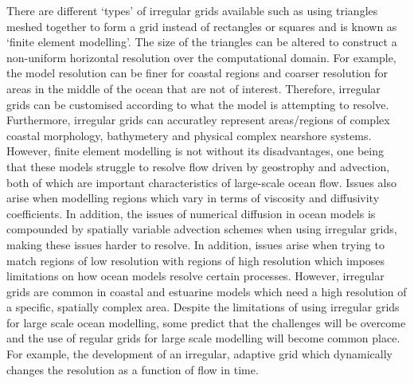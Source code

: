 \documentclass[
]{article}
\begin{document}
There are different `types' of irregular grids available such as using
triangles meshed together to form a grid instead of rectangles or
squares and is known as `finite element modelling'. The size of the
triangles can be altered to construct a non-uniform horizontal
resolution over the computational domain. For example, the model
resolution can be finer for coastal regions and coarser resolution for
areas in the middle of the ocean that are not of interest. Therefore,
irregular grids can be customised according to what the model is
attempting to resolve. Furthermore, irregular grids can accuratley
represent areas/regions of complex coastal morphology, bathymetery and
physical complex nearshore systems. However, finite element modelling is
not without its disadvantages, one being that these models struggle to
resolve flow driven by geostrophy and advection, both of which are
important characteristics of large-scale ocean flow. Issues also arise
when modelling regions which vary in terms of viscosity and diffusivity
coefficients. In addition, the issues of numerical diffusion in ocean
models is compounded by spatially variable advection schemes when using
irregular grids, making these issues harder to resolve. In addition,
issues arise when trying to match regions of low resolution with regions
of high resolution which imposes limitations on how ocean models resolve
certain processes. However, irregular grids are common in coastal and
estuarine models which need a high resolution of a specific, spatially
complex area. Despite the limitations of using irregular grids for large
scale ocean modelling, some predict that the challenges will be overcome
and the use of regular grids for large scale modelling will become
common place. For example, the development of an irregular, adaptive
grid which dynamically changes the resolution as a function of flow in
time.
\end{document}
